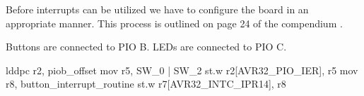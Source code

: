 Before interrupts can be utilized we have to configure the board in an appropriate manner.
This process is outlined on page 24 of the compendium \cite{lab-compendium}.


Buttons are connected to PIO B.
LEDs are connected to PIO C.



lddpc r2, piob_offset
mov r5, SW_0 | SW_2
st.w r2[AVR32_PIO_IER], r5
mov r8, button_interrupt_routine
st.w r7[AVR32_INTC_IPR14], r8
